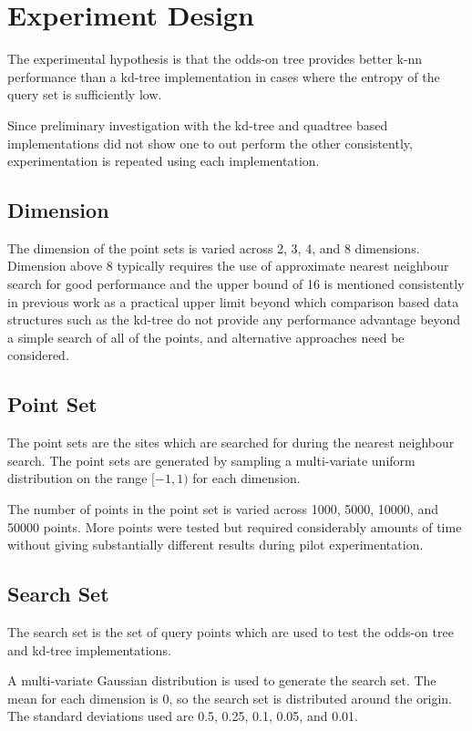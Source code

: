 \documentclass[mcs]{scsthesis}
\begin{document}
\section{Experiment Design}

The experimental hypothesis is that the odds-on tree provides better k-nn
performance than a kd-tree implementation in cases where the entropy of the
query set is sufficiently low.

Since preliminary investigation with the kd-tree and quadtree based
implementations did not show one to out perform the other consistently, 
experimentation is repeated using each implementation. 

\subsection{Dimension}

The dimension of the point sets is varied across 2, 3, 4, and 8
dimensions. Dimension above 8 typically requires the use of approximate nearest
neighbour search for good performance \cite{app-ann} and the upper bound of 16
is mentioned consistently in previous work \cite{fastvector} as a practical
upper limit beyond which comparison based data structures such as the kd-tree do
not provide any performance advantage beyond a simple search of all of the
points, and alternative approaches need be considered.

\subsection{Point Set}

The point sets are the sites which are searched for during the nearest neighbour
search. The point sets are generated by sampling a multi-variate uniform
distribution on the range \([-1, 1)\) for each dimension.

The number of points in the point set is varied across 1000, 5000, 10000, and
50000 points. More points were tested but required considerably amounts of time
without giving substantially different results during pilot experimentation.

\subsection{Search Set}

The search set is the set of query points which are used to test the odds-on
tree and kd-tree implementations.

A multi-variate Gaussian distribution is used to generate the search set. The
mean for each dimension is 0, so the search set is distributed around the
origin. The standard deviations used are 0.5, 0.25, 0.1, 0.05, and 0.01.
\end{document}
